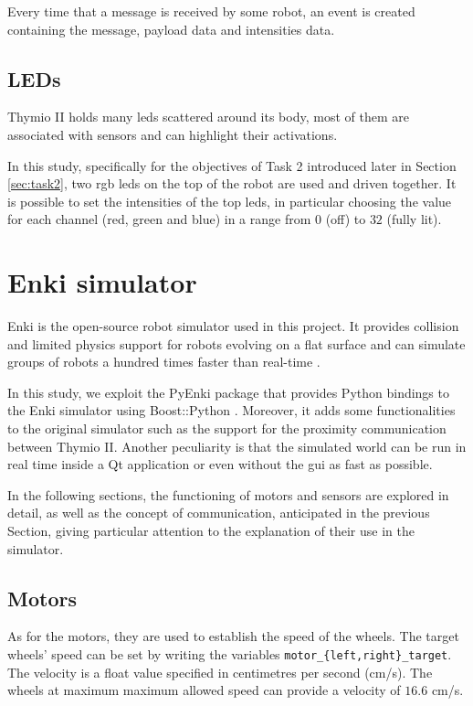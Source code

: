 Every time that a message is received by some robot, an event is 
created containing the message, payload data and intensities data.

\subsection{LEDs}
\label{subsec:thymioled}

Thymio II holds many \glspl{led} scattered around its body, most of them are 
associated 
with sensors and can highlight their activations.

In this study, specifically for the objectives of Task 2 introduced later in Section 
\ref{sec:task2}, two \gls{rgb} \glspl{led} on the top of the robot are used and 
driven together.
It is possible to set the intensities of the top \glspl{led}, in particular choosing the 
value for each channel (red, green and blue) in a range from $0$ (off) to $32$ 
(fully lit).

\section{Enki simulator}
\label{sec:enki}

Enki is the open-source robot simulator used in this project. It provides collision 
and limited physics support for robots evolving on a flat surface and can simulate 
groups of robots a hundred times faster than real-time \cite[see][]{enki}.

In this study, we exploit the PyEnki package \cite[][]{enki-jguzzi} that provides 
Python bindings to the Enki simulator using Boost::Python 
\cite[see][]{boostpython}.
Moreover, it adds some functionalities to the original simulator such as the 
support for the proximity communication between Thymio II.
Another peculiarity is that the simulated world can be run in real time inside a Qt 
application or even without the \gls{gui} as fast as possible.

In the following sections, the functioning of motors and sensors are explored in 
detail, as well as the concept of communication, anticipated in the previous 
Section, giving particular attention to the explanation of their use in the simulator.

\subsection{Motors}
\label{subsec:enkimotors}
As for the motors, they are used to establish the speed of the wheels. The target 
wheels' speed can be set by writing the variables 
\texttt{motor\_\{left,right\}\_target}. The velocity is a float value specified in 
centimetres per second (\gls{cm/s}).
The wheels at maximum maximum allowed speed can provide a velocity of 
$16.6$ \gls{cm/s}.

